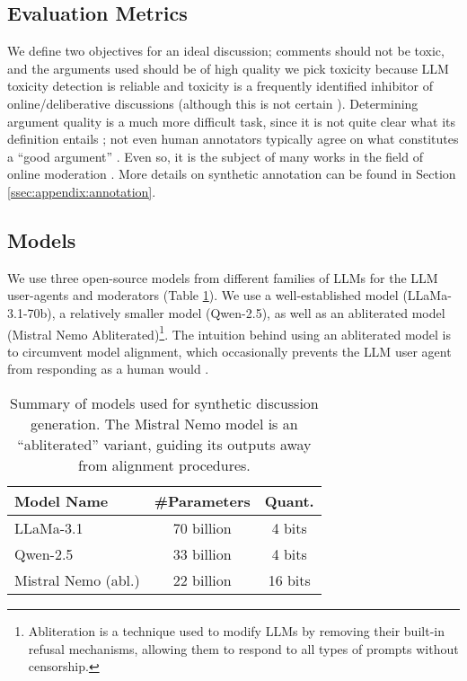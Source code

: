 \subsection{Evaluation Metrics}

We define two objectives for an ideal discussion; comments should not be toxic, and the arguments used should be of high quality we pick toxicity because \ac{LLM} toxicity detection is reliable \citep{kang-qian-2024-implanting, Wang2022ToxicityDW, anjum2024hate} and toxicity is a frequently identified inhibitor of online/deliberative discussions \citep{dekock2022disagree, XiaToxicity} (although this is not certain \citep{Avalle2024PersistentIP}). Determining argument quality is a much more difficult task, since it is not quite clear what its definition entails \cite{korre2025evaluation}; not even human annotators typically agree on what constitutes a “good argument” \cite{argyle2023}. Even so, it is the subject of many works in the field of online moderation \cite{argyle2023, schroeder-etal-2024-fora, falk-etal-2024-moderation, falk-etal-2021-predicting}. More details on synthetic annotation can be found in Section \ref{ssec:appendix:annotation}.


\subsection{Models}

We use three open-source models from different families of \acp{LLM} for the \ac{LLM} user-agents and moderators (Table \ref{tab:models}). We use a well-established model (LLaMa-3.1-70b), a relatively smaller model (Qwen-2.5), as well as an abliterated model (Mistral Nemo Abliterated)\footnote{Abliteration is a technique used to modify \acp{LLM} by removing their built-in refusal mechanisms, allowing them to respond to all types of prompts without censorship.}. The intuition behind using an abliterated model is to circumvent model alignment, which occasionally prevents the \ac{LLM} user agent from responding as a human would \cite{Park2023GenerativeAI}. %

\begin{table}[ht]
\centering
    \begin{tabular}{|l|c|c|}
        \hline
        \textbf{Model Name} & \textbf{\#Parameters} & \textbf{Quant.} \\
        \hline
        LLaMa-3.1 & 70 billion & 4 bits \\
        Qwen-2.5 & 33 billion & 4 bits \\
        Mistral Nemo (abl.) & 22 billion & 16 bits\\
        \hline
    \end{tabular}
\caption{Summary of models used for synthetic discussion generation. The Mistral Nemo model is an “abliterated” variant, guiding its outputs away from alignment procedures.}
\label{tab:models}
\end{table}


